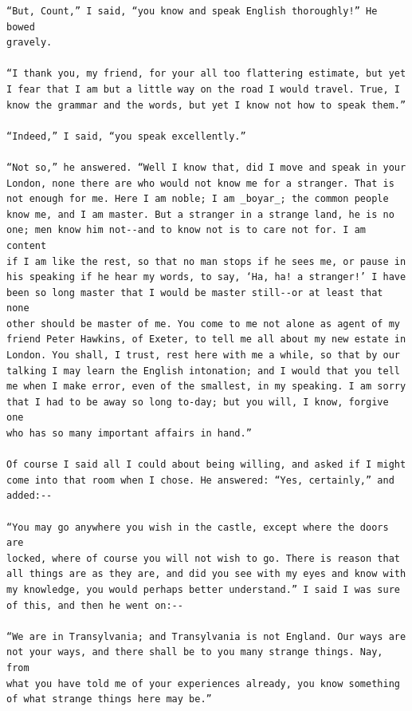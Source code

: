 \documentclass{article}
\begin{document}
\begin{verbatim}
“But, Count,” I said, “you know and speak English thoroughly!” He bowed
gravely.

“I thank you, my friend, for your all too flattering estimate, but yet
I fear that I am but a little way on the road I would travel. True, I
know the grammar and the words, but yet I know not how to speak them.”

“Indeed,” I said, “you speak excellently.”

“Not so,” he answered. “Well I know that, did I move and speak in your
London, none there are who would not know me for a stranger. That is
not enough for me. Here I am noble; I am _boyar_; the common people
know me, and I am master. But a stranger in a strange land, he is no
one; men know him not--and to know not is to care not for. I am content
if I am like the rest, so that no man stops if he sees me, or pause in
his speaking if he hear my words, to say, ‘Ha, ha! a stranger!’ I have
been so long master that I would be master still--or at least that none
other should be master of me. You come to me not alone as agent of my
friend Peter Hawkins, of Exeter, to tell me all about my new estate in
London. You shall, I trust, rest here with me a while, so that by our
talking I may learn the English intonation; and I would that you tell
me when I make error, even of the smallest, in my speaking. I am sorry
that I had to be away so long to-day; but you will, I know, forgive one
who has so many important affairs in hand.”

Of course I said all I could about being willing, and asked if I might
come into that room when I chose. He answered: “Yes, certainly,” and
added:--

“You may go anywhere you wish in the castle, except where the doors are
locked, where of course you will not wish to go. There is reason that
all things are as they are, and did you see with my eyes and know with
my knowledge, you would perhaps better understand.” I said I was sure
of this, and then he went on:--

“We are in Transylvania; and Transylvania is not England. Our ways are
not your ways, and there shall be to you many strange things. Nay, from
what you have told me of your experiences already, you know something
of what strange things here may be.”


\end{verbatim}
\end{document}

